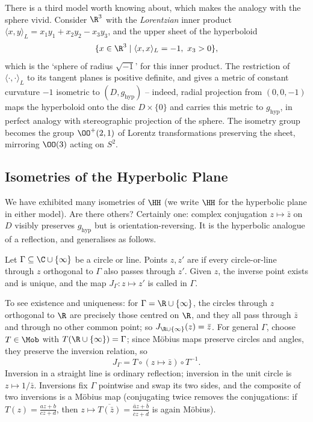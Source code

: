 \begin{remark}
    There is a third model worth knowing about, which makes the analogy with the sphere vivid. Consider $\R^3$ with the \emph{Lorentzian} inner product $\langle x, y \rangle_L = x_1 y_1 + x_2 y_2 - x_3 y_3$, and the upper sheet of the hyperboloid
    $$
    \{x \in \R^3 \mid \langle x, x \rangle_L = -1, \ x_3 > 0\},
    $$
    which is the `sphere of radius $\sqrt{-1}$' for this inner product. The restriction of $\langle \cdot, \cdot \rangle_L$ to its tangent planes is positive definite, and gives a metric of constant curvature $-1$ isometric to $(D, g_{\mathrm{hyp}})$ -- indeed, radial projection from $(0,0,-1)$ maps the hyperboloid onto the disc $D \times \{0\}$ and carries this metric to $g_{\mathrm{hyp}}$, in perfect analogy with stereographic projection of the sphere. The isometry group becomes the group $\OO^+(2,1)$ of Lorentz transformations preserving the sheet, mirroring $\OO(3)$ acting on $S^2$.
\end{remark}

\subsection{Isometries of the Hyperbolic Plane}

We have exhibited many isometries of $\HH$ (we write $\HH$ for the hyperbolic plane in either model). Are there others? Certainly one: complex conjugation $z \mapsto \bar z$ on $D$ visibly preserves $g_{\mathrm{hyp}}$ but is orientation-reversing. It is the hyperbolic analogue of a reflection, and generalises as follows.

\begin{definition}[Inversion]
    Let $\Gamma \subseteq \C \cup \{\infty\}$ be a circle or line. Points $z, z'$ are  if every circle-or-line through $z$ orthogonal to $\Gamma$ also passes through $z'$. Given $z$, the inverse point exists and is unique, and the map $J_\Gamma: z \mapsto z'$ is called  in $\Gamma$.
\end{definition}

To see existence and uniqueness: for $\Gamma = \R \cup \{\infty\}$, the circles through $z$ orthogonal to $\R$ are precisely those centred on $\R$, and they all pass through $\bar z$ and through no other common point; so $J_{\R \cup \{\infty\}}(z) = \bar z$. For general $\Gamma$, choose $T \in \Mob$ with $T(\R \cup \{\infty\}) = \Gamma$; since M\"obius maps preserve circles and angles, they preserve the inversion relation, so
$$
J_\Gamma = T \circ (z \mapsto \bar z) \circ T^{-1}.
$$
Inversion in a straight line is ordinary reflection; inversion in the unit circle is $z \mapsto 1/\bar z$. Inversions fix $\Gamma$ pointwise and swap its two sides, and the composite of two inversions is a M\"obius map (conjugating twice removes the conjugations: if $T(z) = \frac{az + b}{cz + d}$, then $z \mapsto \overline{T(\bar z)} = \frac{\bar a z + \bar b}{\bar c z + \bar d}$ is again M\"obius).

